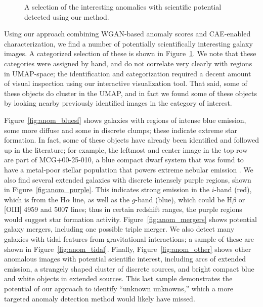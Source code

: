 \begin{figure}

  \vspace{0cm}

  \caption{A selection of the interesting anomalies with scientific potential detected using our method.}
  \label{fig:anomalies}
\end{figure}

Using our approach combining WGAN-based anomaly scores and CAE-enabled characterization, we find a number of potentially scientifically interesting galaxy images.
A categorized selection of these is shown in Figure~\ref{fig:anomalies}.
We note that these categories were assigned by hand, and do not correlate very clearly with regions in UMAP-space; the identification and categorization required a decent amount of visual inspection using our interactive visualization tool.
That said, some of these objects do cluster in the UMAP, and in fact we found some of these objects by looking nearby previously identified images in the category of interest.

Figure~\ref{fig:anom_bluesf} shows galaxies with regions of intense blue emission, some more diffuse and some in discrete clumps; these indicate extreme star formation.
In fact, some of these objects have already been identified and followed up in the literature; for example, the leftmost and center image in the top row are part of MCG+00-25-010, a blue compact dwarf system that was found to have a metal-poor stellar population that powers extreme nebular emission \citep{Senchyna2017}.
We also find several extended galaxies with discrete intensely purple regions, shown in Figure~\ref{fig:anom_purple}.
This indicates strong emission in the $i$-band (red), which is from the H$\alpha$ line, as well as the $g$-band (blue), which could be H$\beta$ or [OIII] 4959 and 5007 lines; thus in certain redshift ranges, the purple regions would suggest star formation activity.
Figure~\ref{fig:anom_mergers} shows potential galaxy mergers, including one possible triple merger. 
We also detect many galaxies with tidal features from gravitational interactions; a sample of these are shown in Figure~\ref{fig:anom_tidal}.
Finally, Figure~\ref{fig:anom_other} shows other anomalous images with potential scientific interest, including arcs of extended emission, a strangely shaped cluster of discrete sources, and bright compact blue and white objects in extended sources.
This last sample demonstrates the potential of our approach to identify ``unknown unknowns,'' which a more targeted anomaly detection method would likely have missed.

